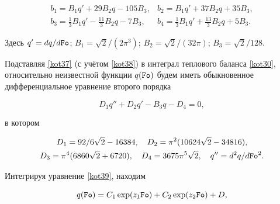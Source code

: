 \begin{equation}

\label{kot38}

\begin{array}{ll}

\displaystyle b_1=B_1q'+29B_2q-105B_3, &

\displaystyle b_2=B_1q'+37B_2q+35B_3,

\\[2mm]

\displaystyle b_3=\frac{1}{3}B_1q'-\frac{11}{3}B_2q-7B_3, &

\displaystyle  b_4=\frac{1}{3}B_1{q}'+\frac{13}{3}B_2q+5B_3.

\end{array}

\end{equation}

Здесь $q'=dq/d\mbox{\tt Fo}$; $B_1=\sqrt{2}/(2\pi^3)$; $B_2=\sqrt{2}/(32\pi)$; $B_3=\sqrt{2}/128$.



Подставляя \eqref{kot37} (с учётом \eqref{kot38}) в интеграл теплового баланса \eqref{kot30}, относительно неизвестной функции $q(\mbox{\tt Fo})$ будем иметь обыкновенное дифференциальное уравнение второго порядка

\begin{equation}

\label{kot39}

D_1q''+D_2q'-B_3q-D_4=0,

\end{equation}

в котором

\begin{gather*}

D_1= 92/6\sqrt{2}-16384, \quad D_2=\pi^2(10624\sqrt{2}-34816),

\\

D_3=\pi^4(6860\sqrt{2}+6720), \quad D_4=3675\pi^5\sqrt{2}, \quad q''=d^2q/d\mbox{\tt Fo}^2.

\end{gather*}

Интегрируя уравнение \eqref{kot39}, находим

\begin{equation}

\label{kot40}

q(\mbox{\tt Fo})=C_1\exp(z_1\mbox{\tt Fo})+C_2\exp(z_2\mbox{\tt Fo})+D,

\end{equation}

